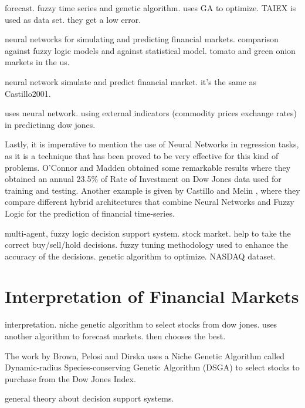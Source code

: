 \cite{Cai2013} forecast. fuzzy time series and genetic algorithm. uses GA to optimize. TAIEX is used as
data set. they get a low error.

\cite{Castillo2001} neural networks for simulating and predicting financial markets. comparison
against fuzzy logic models and against statistical model. tomato and green onion
markets in the us.

\cite{melin2007hybrid} neural network simulate and predict financial
market. it's the same as Castillo2001.

\cite{Connor2005} uses neural network. using external indicators (commodity
prices exchange rates) in predictinng dow jones.

Lastly, it is imperative to mention the use of Neural Networks in regression
tasks, as it is a technique that has been proved to be very effective for this
kind of problems. O'Connor and Madden \cite{Connor2005} obtained some remarkable
results where they obtained an annual 23.5\% of Rate of Investment on Dow Jones
data used for training and testing. Another example is given by Castillo and
Melin \cite{castillo2001simulation}, where they compare different hybrid
architectures that combine Neural Networks and Fuzzy Logic for the prediction of
financial time-series.

\cite{Gamil2007} multi-agent, fuzzy logic decision support system. stock market. help to take the
correct buy/sell/hold decisions. fuzzy tuning methodology used to enhance the
accuracy of the decisions. genetic algorithm to optimize. NASDAQ dataset.

\section{Interpretation of Financial Markets}
\label{section:interpretation-of-financial-markets}

\cite{Brown2013} interpretation. niche genetic algorithm to select stocks from dow jones. uses
another algorithm to forecast markets. then chooses the best.

The work by Brown, Pelosi and Dirska uses a Niche Genetic Algorithm called
Dynamic-radius Species-conserving Genetic Algorithm (DSGA) to select stocks to
purchase from the Dow Jones Index.

\cite{Keen1980} general theory about decision support systems.

